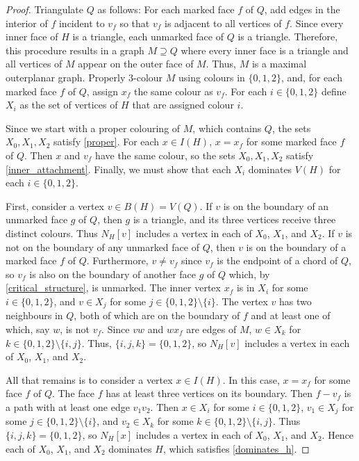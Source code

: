 \documentclass{patmorin}
\begin{document}
\begin{proof}
Triangulate $Q$ as follows:  For each marked face $f$ of $Q$, add edges in the interior of $f$ incident to $v_f$ so that $v_f$ is adjacent to all vertices of $f$. Since every inner face of $H$ is a triangle, each unmarked face of $Q$ is a triangle. Therefore, this procedure results in a graph $M\supseteq Q$ where every inner face is a triangle and all vertices of $M$ appear on the outer face of $M$.  Thus, $M$ is a maximal outerplanar graph.  Properly $3$-colour $M$ using colours in $\{0,1,2\}$,
and, for each marked face $f$ of $Q$, assign $x_f$ the same colour as $v_f$.  For each $i\in\{0,1,2\}$ define $X_i$ as the set of vertices of $H$ that are assigned colour $i$.

Since we start with a proper colouring of $M$, which contains $Q$, the sets $X_0,X_1,X_2$ satisfy \ref{proper}.  For each $x\in I(H)$, $x=x_f$ for some marked face $f$ of $Q$.  Then $x$ and $v_f$ have the same colour, so the sets $X_0,X_1,X_2$ satisfy \ref{inner_attachment}. Finally, we must show that each $X_i$ dominates $V(H)$ for each $i\in\{0,1,2\}$.  

First, consider a vertex $v\in B(H)=V(Q)$.  If $v$ is on the boundary of an unmarked face $g$ of $Q$, then $g$ is a triangle, and its three vertices receive three distinct colours.  Thus $N_H[v]$ includes a vertex in each of $X_0$, $X_1$, and $X_2$. If $v$ is not on the boundary of any unmarked face of $Q$, then $v$ is on the boundary of a marked face $f$ of $Q$.  Furthermore, $v\neq v_f$ since $v_f$ is the endpoint of a chord of $Q$, so $v_f$ is also on the boundary of another face $g$ of $Q$ which, by \cref{critical_structure}, is unmarked.  The inner vertex $x_f$ is in $X_i$ for some $i\in\{0,1,2\}$, and $v\in X_j$ for some $j\in\{0,1,2\}\setminus\{i\}$. The vertex $v$ has two neighbours in $Q$, both of which are on the boundary of $f$ and at least one of which, say $w$, is not $v_f$.  Since $vw$ and $wx_f$ are edges of $M$, $w\in X_{k}$ for $k\in \{0,1,2\}\setminus\{i,j\}$.  Thus, $\{i,j,k\}=\{0,1,2\}$, so $N_H[v]$ includes a vertex in each of $X_0$, $X_1$, and $X_2$.  

All that remains is to consider a vertex $x\in I(H)$.  In this case, $x=x_f$ for some face $f$ of $Q$.  The face $f$ has at least three vertices on its boundary.  Then $f-v_f$ is a path with at least one edge $v_1v_2$.  Then $x\in X_i$ for some $i\in\{0,1,2\}$, $v_1\in X_j$ for some $j\in\{0,1,2\}\setminus\{i\}$, and $v_2\in X_k$ for some $k\in\{0,1,2\}\setminus\{i,j\}$.  Thus $\{i,j,k\}=\{0,1,2\}$, so $N_H[x]$ includes a vertex in each of $X_0$, $X_1$, and $X_2$.  Hence each of $X_0$, $X_1$, and $X_2$ dominates $H$, which satisfies \ref{dominates_h}.
\end{proof}
\end{document}
